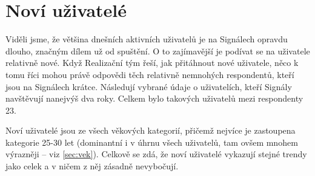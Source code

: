 \section{Noví uživatelé}

Viděli jsme, že většina dnešních aktivních uživatelů je na Signálech
opravdu dlouho, značným dílem už od spuštění. O to zajímavější
je podívat se na uživatele relativně nové. Když Realizační tým
řeší, jak přitáhnout nové uživatele, něco k tomu říci
mohou právě odpovědi těch relativně nemnohých respondentů,
kteří jsou na Signálech krátce. Následují vybrané údaje
o uživatelích, kteří Signály navštěvují nanejvýš dva roky.
Celkem bylo takových uživatelů mezi respondenty 23.

Noví uživatelé jsou ze všech věkových kategorií, přičemž nejvíce
je zastoupena kategorie 25-30 let (dominantní i v úhrnu všech
uživatelů, tam ovšem mnohem výrazněji --
viz \ref{sec:vek}). Celkově se zdá, že noví uživatelé
vykazují stejné trendy jako celek a v ničem z něj zásadně
nevybočují.






